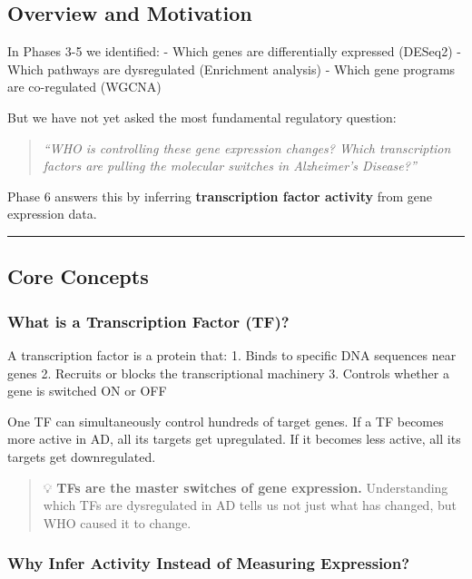 \documentclass[
]{article}
\begin{document}
\subsection{Overview and Motivation}\label{overview-and-motivation-1}

In Phases 3-5 we identified: - Which genes are differentially expressed
(DESeq2) - Which pathways are dysregulated (Enrichment analysis) - Which
gene programs are co-regulated (WGCNA)

But we have not yet asked the most fundamental regulatory question:

\begin{quote}
\emph{``WHO is controlling these gene expression changes? Which
transcription factors are pulling the molecular switches in Alzheimer's
Disease?''}
\end{quote}

Phase 6 answers this by inferring \textbf{transcription factor activity}
from gene expression data.

\begin{center}\rule{0.5\linewidth}{0.5pt}\end{center}

\subsection{Core Concepts}\label{core-concepts}

\subsubsection{What is a Transcription Factor
(TF)?}\label{what-is-a-transcription-factor-tf}

A transcription factor is a protein that: 1. Binds to specific DNA
sequences near genes 2. Recruits or blocks the transcriptional machinery
3. Controls whether a gene is switched ON or OFF

One TF can simultaneously control hundreds of target genes. If a TF
becomes more active in AD, all its targets get upregulated. If it
becomes less active, all its targets get downregulated.

\begin{quote}
💡 \textbf{TFs are the master switches of gene expression.}
Understanding which TFs are dysregulated in AD tells us not just what
has changed, but WHO caused it to change.
\end{quote}

\subsubsection{Why Infer Activity Instead of Measuring
Expression?}\label{why-infer-activity-instead-of-measuring-expression}
\end{document}
